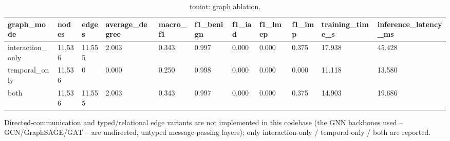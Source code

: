 \begin{table}[t]
\centering
\caption{toniot: graph ablation.}
\label{tab:toniot_graph_ablation}
\begin{tabular}{lllllllllll}
\toprule
graph\_mode & nodes & edges & average\_degree & macro\_f1 & f1\_benign & f1\_iad & f1\_lmep & f1\_imp & training\_time\_s & inference\_latency\_ms \\
\midrule
interaction\_only & 11,536 & 11,555 & 2.003 & 0.343 & 0.997 & 0.000 & 0.000 & 0.375 & 17.938 & 45.428 \\
temporal\_only & 11,536 & 0 & 0.000 & 0.250 & 0.998 & 0.000 & 0.000 & 0.000 & 11.118 & 13.580 \\
both & 11,536 & 11,555 & 2.003 & 0.343 & 0.997 & 0.000 & 0.000 & 0.375 & 14.903 & 19.686 \\
\bottomrule
\end{tabular}
\vspace{2pt}
\parbox{\linewidth}{\footnotesize Directed-communication and typed/relational edge variants are not implemented in this codebase (the GNN backbones used -- GCN/GraphSAGE/GAT -- are undirected, untyped message-passing layers); only interaction-only / temporal-only / both are reported.}
\end{table}
